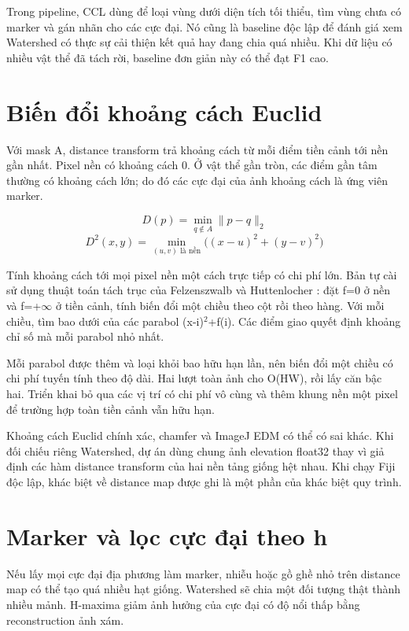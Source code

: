 \documentclass[12pt,a4paper,oneside]{report}
\begin{document}
Trong pipeline, CCL dùng để loại vùng dưới diện tích tối thiểu, tìm vùng chưa có marker và gán nhãn cho các cực đại. Nó cũng là baseline độc lập để đánh giá xem Watershed có thực sự cải thiện kết quả hay đang chia quá nhiều. Khi dữ liệu có nhiều vật thể đã tách rời, baseline đơn giản này có thể đạt F1 cao.



\section{Biến đổi khoảng cách Euclid}
Với mask A, distance transform trả khoảng cách từ mỗi điểm tiền cảnh tới nền gần nhất. Pixel nền có khoảng cách 0. Ở vật thể gần tròn, các điểm gần tâm thường có khoảng cách lớn; do đó các cực đại của ảnh khoảng cách là ứng viên marker.

\begin{equation}D(p)=\min_{q\notin A}\lVert p-q\rVert_2\end{equation}
\begin{equation}D^2(x,y)=\min_{(u,v)\text{ là nền}}\big((x-u)^2+(y-v)^2\big)\end{equation}

Tính khoảng cách tới mọi pixel nền một cách trực tiếp có chi phí lớn. Bản tự cài sử dụng thuật toán tách trục của Felzenszwalb và Huttenlocher \cite{ref3}: đặt f=0 ở nền và f=+\ensuremath{\infty} ở tiền cảnh, tính biến đổi một chiều theo cột rồi theo hàng. Với mỗi chiều, tìm bao dưới của các parabol (x-i)\ensuremath{^2}+f(i). Các điểm giao quyết định khoảng chỉ số mà mỗi parabol nhỏ nhất.

Mỗi parabol được thêm và loại khỏi bao hữu hạn lần, nên biến đổi một chiều có chi phí tuyến tính theo độ dài. Hai lượt toàn ảnh cho O(HW), rồi lấy căn bậc hai. Triển khai bỏ qua các vị trí có chi phí vô cùng và thêm khung nền một pixel để trường hợp toàn tiền cảnh vẫn hữu hạn.

Khoảng cách Euclid chính xác, chamfer và ImageJ EDM có thể có sai khác. Khi đối chiếu riêng Watershed, dự án dùng chung ảnh elevation float32 thay vì giả định các hàm distance transform của hai nền tảng giống hệt nhau. Khi chạy Fiji độc lập, khác biệt về distance map được ghi là một phần của khác biệt quy trình.

\section{Marker và lọc cực đại theo h}
Nếu lấy mọi cực đại địa phương làm marker, nhiễu hoặc gồ ghề nhỏ trên distance map có thể tạo quá nhiều hạt giống. Watershed sẽ chia một đối tượng thật thành nhiều mảnh. H-maxima giảm ảnh hưởng của cực đại có độ nổi thấp bằng reconstruction ảnh xám.
\end{document}
